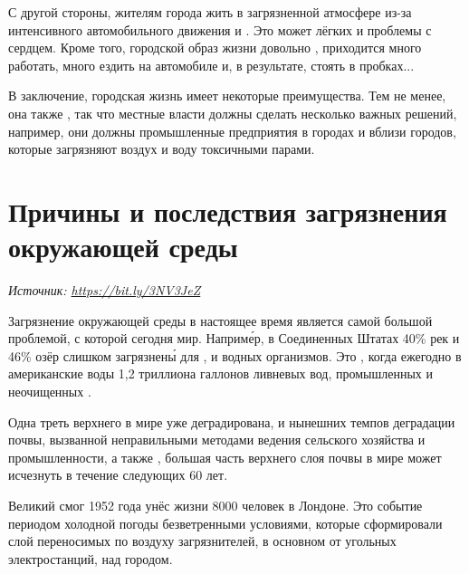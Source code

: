 С другой стороны, жителям города  жить в загрязненной атмосфере из-за интенсивного автомобильного движения и  . Это может   лёгких и проблемы с сердцем. Кроме того, городской образ жизни довольно ,  приходится много работать, много ездить на автомобиле и, в результате, стоять в пробках...

В заключение, городская жизнь имеет некоторые преимущества. Тем не менее, она также , так что местные власти должны сделать несколько важных решений, например, они должны  промышленные предприятия в городах и вблизи городов, которые загрязняют воздух и воду токсичными парами.

\newpage
\section[Загрязнение окружающей среды]{Причины и последствия загрязнения окружающей среды}
\textit{Источник: \url{https://bit.ly/3NV3JeZ}}

Загрязнение окружающей среды в настоящее время является самой большой проблемой, с которой сегодня  мир. Наприм\'{е}р, в Соединенных Штатах 40\% рек и 46\% озёр слишком загрязнен\'{ы} для ,  и водных организмов. Это , когда ежегодно в американские воды  1,2 триллиона галлонов  ливневых вод, промышленных  и неочищенных .

Одна треть верхнего   в мире уже деградирована, и  нынешних темпов деградации почвы, вызванной неправильными методами ведения сельского хозяйства и промышленности, а также , большая часть верхнего слоя почвы в мире может исчезнуть в течение следующих 60 лет.

Великий смог 1952 года унёс жизни 8000 человек в Лондоне. Это событие  периодом холодной погоды  безветренными условиями, которые сформировали  слой переносимых по воздуху загрязнителей, в основном от угольных электростанций, над городом.

